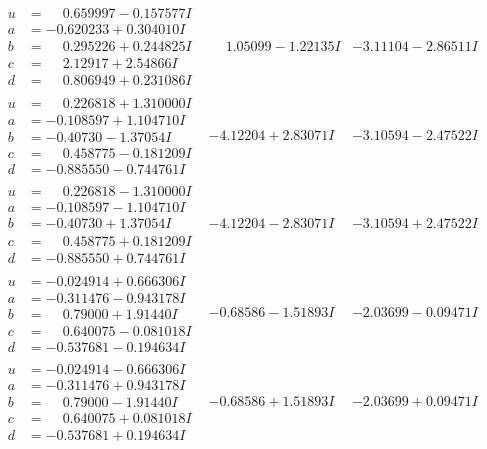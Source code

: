 \documentclass[1p]{elsarticle_modified}
\theoremstyle{definition}
\begin{document}
$$\begin{array}{c|c|c}
\begin{aligned}
u &= \phantom{-}0.659997 - 0.157577 I \\
a &= -0.620233 + 0.304010 I \\
b &= \phantom{-}0.295226 + 0.244825 I \\
c &= \phantom{-}2.12917 + 2.54866 I \\
d &= \phantom{-}0.806949 + 0.231086 I\end{aligned}
 & \phantom{-}1.05099 - 1.22135 I & -3.11104 - 2.86511 I \\ \hline\begin{aligned}
u &= \phantom{-}0.226818 + 1.310000 I \\
a &= -0.108597 + 1.104710 I \\
b &= -0.40730 - 1.37054 I \\
c &= \phantom{-}0.458775 - 0.181209 I \\
d &= -0.885550 - 0.744761 I\end{aligned}
 & -4.12204 + 2.83071 I & -3.10594 - 2.47522 I \\ \hline\begin{aligned}
u &= \phantom{-}0.226818 - 1.310000 I \\
a &= -0.108597 - 1.104710 I \\
b &= -0.40730 + 1.37054 I \\
c &= \phantom{-}0.458775 + 0.181209 I \\
d &= -0.885550 + 0.744761 I\end{aligned}
 & -4.12204 - 2.83071 I & -3.10594 + 2.47522 I \\ \hline\begin{aligned}
u &= -0.024914 + 0.666306 I \\
a &= -0.311476 - 0.943178 I \\
b &= \phantom{-}0.79000 + 1.91440 I \\
c &= \phantom{-}0.640075 - 0.081018 I \\
d &= -0.537681 - 0.194634 I\end{aligned}
 & -0.68586 - 1.51893 I & -2.03699 - 0.09471 I \\ \hline\begin{aligned}
u &= -0.024914 - 0.666306 I \\
a &= -0.311476 + 0.943178 I \\
b &= \phantom{-}0.79000 - 1.91440 I \\
c &= \phantom{-}0.640075 + 0.081018 I \\
d &= -0.537681 + 0.194634 I\end{aligned}
 & -0.68586 + 1.51893 I & -2.03699 + 0.09471 I\\

\end{array}$$
\end{document}
